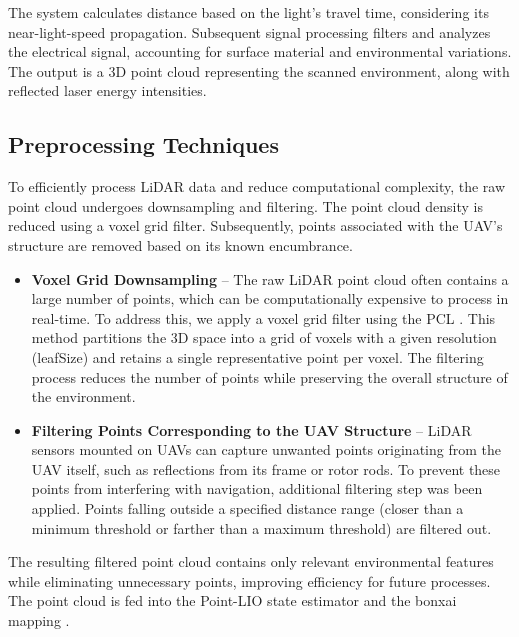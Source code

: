             The system calculates distance based on the light's travel time, considering its near-light-speed propagation. 
            Subsequent signal processing filters and analyzes the electrical signal, accounting for surface material and environmental variations. 
            The output is a 3D point cloud representing the scanned environment, along with reflected laser energy intensities. 

        \subsection{Preprocessing Techniques}
            To efficiently process \ac{LiDAR} data and reduce computational complexity, the raw point cloud undergoes downsampling and filtering. 
            The point cloud density is reduced using a voxel grid filter. 
            Subsequently, points associated with the \ac{UAV}'s structure are removed based on its known encumbrance.
            \begin{itemize}
                \item \textbf{Voxel Grid Downsampling} -- The raw \ac{LiDAR} point cloud often contains a large number of points, which can be computationally expensive to process in real-time. 
                To address this, we apply a voxel grid filter using the \ac{PCL} \cite{pcl_voxelgrid}. 
                This method partitions the 3D space into a grid of voxels with a given resolution (leafSize) and retains a single representative point per voxel. 
                The filtering process reduces the number of points while preserving the overall structure of the environment.
                \item \textbf{Filtering Points Corresponding to the UAV Structure} -- \ac{LiDAR} sensors mounted on \ac{UAV}s can capture unwanted points originating from the \ac{UAV} itself, such as reflections from its frame or rotor rods. 
                To prevent these points from interfering with navigation, additional filtering step was been applied.
                Points falling outside a specified distance range (closer than a minimum threshold or farther than a maximum threshold) are filtered out.
            \end{itemize}
            The resulting filtered point cloud contains only relevant environmental features while eliminating unnecessary points, improving efficiency for future processes.
            The point cloud is fed into the \ac{Point-LIO} \cite{point_lio_paper} state estimator and the bonxai mapping \cite{Bonxai2025}. 

